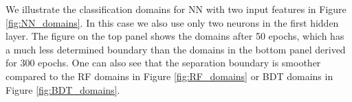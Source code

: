 We illustrate the classification domains for NN with two input features in Figure \ref{fig:NN_domains}. 
In this case we also use only two neurons in the first hidden layer.
The figure on the top panel shows the domains after 50 epochs, which has a much less determined boundary than the
domains in the bottom panel derived for 300 epochs. 
One can also see that the separation boundary is smoother compared to the RF domains in Figure \ref{fig:RF_domains} or BDT domains in Figure \ref{fig:BDT_domains}.

